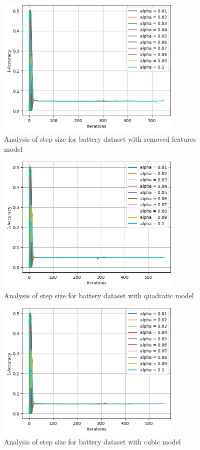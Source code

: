 \documentclass{article}
\begin{document}
\begin{figure}[H]
  \centering
  \includegraphics[width=0.8\textwidth]{Batmodel3.png}
  \caption{Analysis of step size for battery dataset with removed features model}
  \label{fig:quad_battery}
\end{figure}

\begin{figure}[H]
  \centering
  \includegraphics[width=0.8\textwidth]{Batmodel4.png}
  \caption{Analysis of step size for battery dataset with quadratic model}
  \label{fig:quad_battery}
\end{figure}

\begin{figure}[H]
  \centering
  \includegraphics[width=0.8\textwidth]{Batmodel5.png}
  \caption{Analysis of step size for battery dataset with cubic model }
  \label{fig:quad_battery}
\end{figure}
\end{document}
